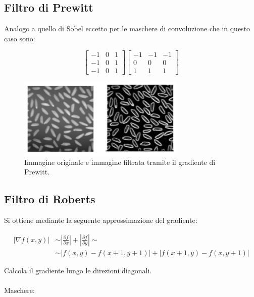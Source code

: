 \subsection{Filtro di Prewitt}
Analogo a quello di Sobel eccetto per le maschere di convoluzione che in questo
caso sono:
\begin{center}
    \[
        \begin{bmatrix}
            -1 & 0 & 1 \\
            -1 & 0 & 1 \\
            -1 & 0 & 1
        \end{bmatrix}
        \begin{bmatrix}
            -1 & -1 & -1 \\
            0  & 0  & 0  \\
            1  & 1  & 1
        \end{bmatrix}
    \]
\end{center}


\begin{figure}[H]
    \centering
    \includegraphics[width=8cm, keepaspectratio]{capitoli/immagini/imgs/prewitt.png}
    \caption{Immagine originale e immagine filtrata tramite il gradiente di Prewitt.}
\end{figure}

\subsection{Filtro di Roberts}
Si ottiene mediante la seguente approssimazione del gradiente:

\begin{align*}
    |\nabla f(x,y)| & \sim |\frac{\partial{f}}{\partial{x}}| + |\frac{\partial{f}}{\partial{y}}| \sim \\
                    & \sim |f(x,y) - f(x+1, y+1)| + |f(x+1, y) - f(x,y+1)|
\end{align*}

Calcola il gradiente lungo le direzioni diagonali. \\\\
Maschere:

